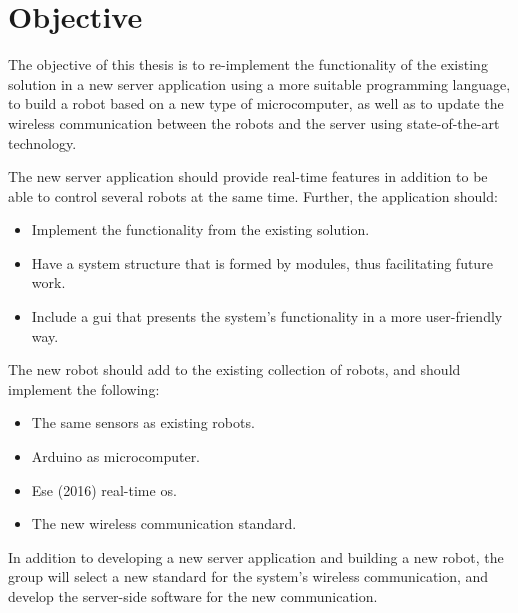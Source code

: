 \section{Objective}
The objective of this thesis is to re-implement the functionality of the existing solution in a new server application using a more suitable programming language, to build a robot based on a new type of microcomputer, as well as to update the wireless communication between the robots and the server using state-of-the-art technology. 

The new server application should provide real-time features in addition to be able to control several robots at the same time. Further, the application should:
\begin{itemize}
    \item Implement the functionality from the existing solution.
    \item Have a system structure that is formed by modules, thus facilitating future work.
    \item Include a \acrlong{gui} that presents the system's functionality in a more user-friendly way.
\end{itemize}

The new robot should add to the existing collection of robots, and should implement the following:
\begin{itemize}
    \item The same sensors as existing robots.
    \item Arduino as microcomputer.
    \item Ese (2016) real-time \acrfull{os}.
    \item The new wireless communication standard.
\end{itemize}

In addition to developing a new server application and building a new robot, the group will select a new standard for the system's wireless communication, and develop the server-side software for the new communication.